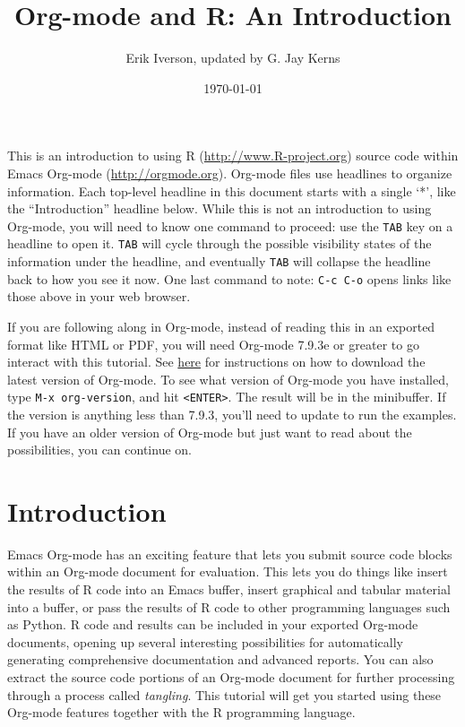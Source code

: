 \documentclass[11pt]{article}
\author{Erik Iverson, updated by G. Jay Kerns}
\date{\today}
\title{Org-mode and R: An Introduction}
\begin{document}
\maketitle
\setcounter{tocdepth}{2}
\tableofcontents

This is an introduction to using R (\url{http://www.R-project.org}) source
code within Emacs Org-mode (\url{http://orgmode.org}). Org-mode files use
headlines to organize information. Each top-level headline in this
document starts with a single `*', like the ``Introduction'' headline
below. While this is not an introduction to using Org-mode, you will
need to know one command to proceed: use the \texttt{TAB} key on a headline
to open it. \texttt{TAB} will cycle through the possible visibility states of
the information under the headline, and eventually \texttt{TAB} will collapse
the headline back to how you see it now. One last command to note:
\texttt{C-c C-o} opens links like those above in your web browser.

If you are following along in Org-mode, instead of reading this in an
exported format like HTML or PDF, you will need Org-mode 7.9.3e or
greater to go interact with this tutorial. See \href{http://orgmode.org/index.html#sec-3}{here} for instructions
on how to download the latest version of Org-mode. To see what version
of Org-mode you have installed, type \texttt{M-x org-version}, and hit
\texttt{<ENTER>}. The result will be in the minibuffer. If the version is
anything less than 7.9.3, you'll need to update to run the
examples. If you have an older version of Org-mode but just want to
read about the possibilities, you can continue on.

\section*{Introduction}
\label{sec-1}

Emacs Org-mode has an exciting feature that lets you submit source
code blocks within an Org-mode document for evaluation. This lets you
do things like insert the results of R code into an Emacs buffer,
insert graphical and tabular material into a buffer, or pass the
results of R code to other programming languages such as Python. R
code and results can be included in your exported Org-mode documents,
opening up several interesting possibilities for automatically
generating comprehensive documentation and advanced reports. You can
also extract the source code portions of an Org-mode document for
further processing through a process called \emph{tangling}. This tutorial
will get you started using these Org-mode features together with the R
programming language.
\end{document}
